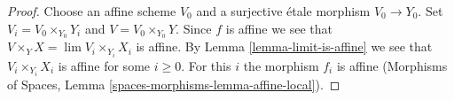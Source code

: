 \documentclass{stacks-project}
\theoremstyle{plain}
\theoremstyle{definition}
\theoremstyle{remark}
\numberwithin{equation}{subsection}
\def\lim{\mathop{\mathrm{lim}}\nolimits}
\begin{document}
\begin{proof}
Choose an affine scheme $V_0$ and a surjective \'etale morphism $V_0 \to Y_0$.
Set $V_i = V_0 \times_{Y_0} Y_i$ and $V = V_0 \times_{Y_0} Y$.
Since $f$ is affine we see that $V \times_Y X = \lim V_i \times_{Y_i} X_i$
is affine. By Lemma \ref{lemma-limit-is-affine} we see that
$V_i \times_{Y_i} X_i$ is affine for some $i \geq 0$. For this $i$ the morphism
$f_i$ is affine
(Morphisms of Spaces, Lemma \ref{spaces-morphisms-lemma-affine-local}).
\end{proof}
\end{document}
